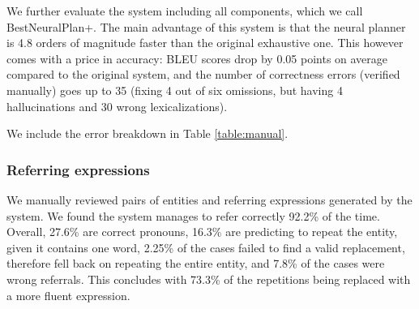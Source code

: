 We further evaluate the system including all components, which we call BestNeuralPlan+. The main advantage of this system is that the neural planner is 4.8 orders of magnitude faster than the original exhaustive one. This however comes with a price in accuracy: BLEU scores drop by 0.05 points on average compared to the original system, and the number of correctness errors (verified manually) goes up to 35 (fixing 4 out of six omissions, but having 4 hallucinations and 30 wrong lexicalizations).

We include the error breakdown in Table \ref{table:manual}.


\subsubsection{Referring expressions} We manually reviewed pairs of entities and referring expressions generated by the system. We found the system manages to refer correctly 92.2\% of the time. Overall, 27.6\% are correct pronouns, 16.3\% are predicting to repeat the entity, given it contains one word, 2.25\% of the cases failed to find a valid replacement, therefore fell back on repeating the entire entity, and 7.8\% of the cases were wrong referrals. This concludes with 73.3\% of the repetitions being replaced with a more fluent expression.  


